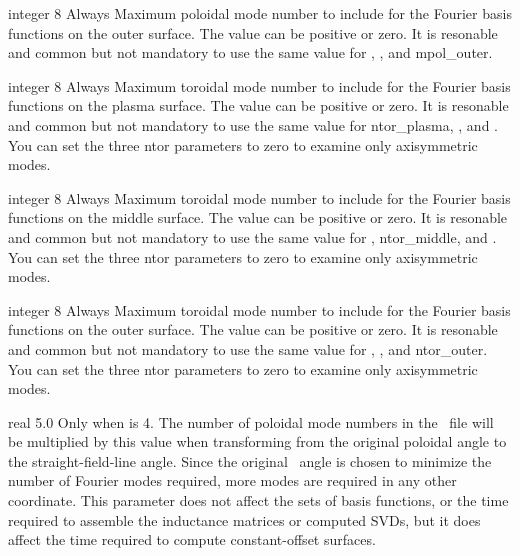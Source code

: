 \myhrule

{integer}
{8}
{Always}
{Maximum poloidal mode number to include for the Fourier basis functions on the outer surface. The value can be positive or zero.
It is resonable and common but not mandatory to use the same value for , , and {\ttfamily mpol\_outer}.}

\myhrule

{integer}
{8}
{Always}
{Maximum toroidal mode number to include for the Fourier basis functions on the plasma surface. The value can be positive or zero.
It is resonable and common but not mandatory to use the same value for {\ttfamily ntor\_plasma}, , and .
You can set the three {\ttfamily ntor} parameters to zero to examine only axisymmetric modes.}

\myhrule

{integer}
{8}
{Always}
{Maximum toroidal mode number to include for the Fourier basis functions on the middle surface. The value can be positive or zero.
It is resonable and common but not mandatory to use the same value for , {\ttfamily ntor\_middle}, and .
You can set the three {\ttfamily ntor} parameters to zero to examine only axisymmetric modes.}

\myhrule

{integer}
{8}
{Always}
{Maximum toroidal mode number to include for the Fourier basis functions on the outer surface. The value can be positive or zero.
It is resonable and common but not mandatory to use the same value for , , and {\ttfamily ntor\_outer}.
You can set the three {\ttfamily ntor} parameters to zero to examine only axisymmetric modes.}

\myhrule

{real}
{5.0}
{Only when  is 4.}
{The number of poloidal mode numbers in the \vmec~file will be multiplied by this value
when transforming from the original poloidal angle to the straight-field-line angle.
Since the original \vmec~angle is chosen to minimize the number of Fourier modes required,
more modes are required in any other coordinate.
This parameter does not affect the sets of basis functions,
or the time required to assemble the inductance matrices or
computed SVDs, but it does affect the time required to compute constant-offset surfaces.
}

